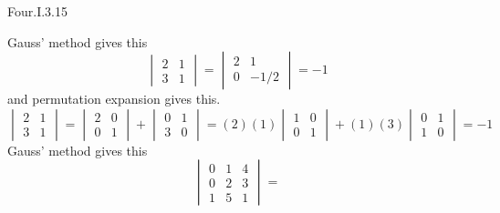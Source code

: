 \begin{ans}{Four.I.3.15}
      \begin{exparts}
        \partsitem Gauss' method gives this
          \begin{equation*}
             \begin{vmatrix}
                 2  &1  \\
                 3  &1
             \end{vmatrix}
             =
             \begin{vmatrix}
                 2  &1  \\
                 0  &-1/2
             \end{vmatrix}
             =-1
          \end{equation*}
          and permutation expansion gives this.
          \begin{equation*}
             \begin{vmatrix}
                 2  &1  \\
                 3  &1
             \end{vmatrix}
             =
             \begin{vmatrix}
                 2  &0  \\
                 0  &1
             \end{vmatrix} +
             \begin{vmatrix}
                 0  &1  \\
                 3  &0
             \end{vmatrix}
             =
             (2)(1)\begin{vmatrix}
                 1  &0  \\
                 0  &1
             \end{vmatrix} +
             (1)(3)\begin{vmatrix}
                 0  &1  \\
                 1  &0
             \end{vmatrix}
             =
             -1
          \end{equation*}
        \partsitem Gauss' method gives this
          \begin{equation*}
            \begin{vmatrix}
              0  &1  &4  \\
              0  &2  &3  \\
              1  &5  &1
            \end{vmatrix}
            =

\end{equation*}
\end{exparts}
\end{ans}
